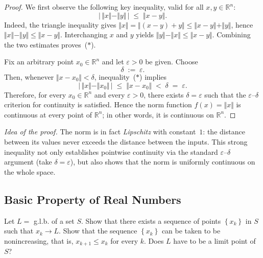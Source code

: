 \documentclass[10pt]{extarticle}
\begin{document}
\begin{proof}
    We first observe the following key inequality, valid for all $x,y\in\mathbb R^{n}$:
    \[
        \bigl|\,\Vert x\Vert-\Vert y\Vert\,\bigr|\;\le\;\Vert x-y\Vert.\tag{$\ast$}
    \]
    Indeed, the triangle inequality gives $\Vert x\Vert=\Vert(x-y)+y\Vert\le\Vert x-y\Vert+\Vert y\Vert$, hence $\Vert x\Vert-\Vert y\Vert\le\Vert x-y\Vert$.  Interchanging $x$ and $y$ yields $\Vert y\Vert-\Vert x\Vert\le\Vert x-y\Vert$.  Combining the two estimates proves~($\ast$).

    \medskip
    Fix an arbitrary point $x_{0}\in\mathbb R^{n}$ and let $\varepsilon>0$ be given.  Choose
    \[
        \delta\;:=\;\varepsilon.
    \]
    Then, whenever $\Vert x-x_{0}\Vert<\delta$, inequality~($\ast$) implies
    \[
        \bigl|\,\Vert x\Vert-\Vert x_{0}\Vert\,\bigr|\;\le\;\Vert x-x_{0}\Vert\;<\;\delta\;=\;\varepsilon.
    \]
    Therefore, for every $x_{0}\in\mathbb R^{n}$ and every $\varepsilon>0$, there exists $\delta=\varepsilon$ such that the $\varepsilon$--$\delta$ criterion for continuity is satisfied.  Hence the norm function $f(x)=\Vert x\Vert$ is continuous at every point of $\mathbb R^{n}$; in other words, it is continuous on $\mathbb R^{n}$.
\end{proof}

\begin{remark}
    \emph{Idea of the proof.}  The norm is in fact \emph{Lipschitz} with constant~$1$: the distance between its values never exceeds the distance between the inputs.  This strong inequality not only establishes pointwise continuity via the standard $\varepsilon$--$\delta$ argument (take $\delta=\varepsilon$), but also shows that the norm is uniformly continuous on the whole space.
\end{remark}

\subsection{Basic Property of Real Numbers}

\begin{exercise}[6.1]
    Let $L=$ g.l.b. of a set $S$. Show that there exists a sequence of points $\left\{x_k\right\}$ in $S$ such that $x_k \rightarrow L$. Show that the sequence $\left\{x_k\right\}$ can be taken to be nonincreasing, that is, $x_{k+1} \leqslant x_k$ for every $k$. Does $L$ have to be a limit point of $S$?
\end{exercise}
\end{document}
